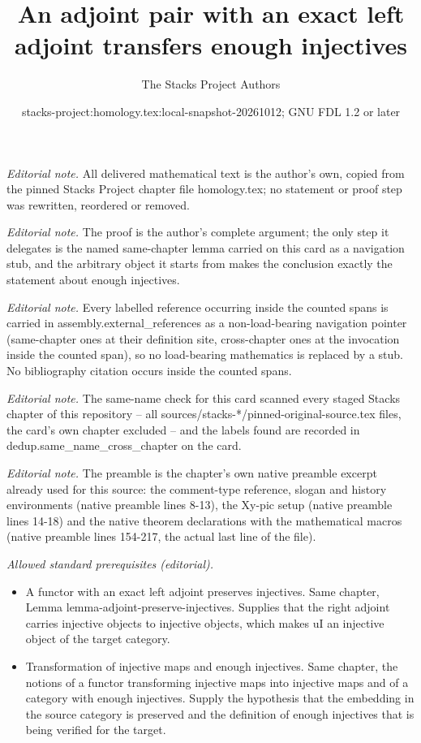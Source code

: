 \documentclass[10pt,a4paper]{amsart}
\title{An adjoint pair with an exact left adjoint transfers enough injectives}
\author{The Stacks Project Authors}
\date{stacks-project:homology.tex:local-snapshot-20261012; GNU FDL 1.2 or later}
\theoremstyle{plain}
\theoremstyle{definition}
\theoremstyle{remark}
\numberwithin{equation}{subsection}
\begin{document}
\maketitle
\noindent\textit{Editorial note.} All delivered mathematical text is the author's own, copied from the pinned Stacks Project chapter file homology.tex; no statement or proof step was rewritten, reordered or removed.\par\medskip
\noindent\textit{Editorial note.} The proof is the author's complete argument; the only step it delegates is the named same-chapter lemma carried on this card as a navigation stub, and the arbitrary object it starts from makes the conclusion exactly the statement about enough injectives.\par\medskip
\noindent\textit{Editorial note.} Every labelled reference occurring inside the counted spans is carried in assembly.external\_references as a non-load-bearing navigation pointer (same-chapter ones at their definition site, cross-chapter ones at the invocation inside the counted span), so no load-bearing mathematics is replaced by a stub. No bibliography citation occurs inside the counted spans.\par\medskip
\noindent\textit{Editorial note.} The same-name check for this card scanned every staged Stacks chapter of this repository -- all sources/stacks-*/pinned-original-source.tex files, the card's own chapter excluded -- and the labels found are recorded in dedup.same\_name\_cross\_chapter on the card.\par\medskip
\noindent\textit{Editorial note.} The preamble is the chapter's own native preamble excerpt already used for this source: the comment-type reference, slogan and history environments (native preamble lines 8-13), the Xy-pic setup (native preamble lines 14-18) and the native theorem declarations with the mathematical macros (native preamble lines 154-217, the actual last line of the file).\par\medskip
\noindent\textit{Allowed standard prerequisites (editorial).}\begin{itemize}
\item A functor with an exact left adjoint preserves injectives. Same chapter, Lemma lemma-adjoint-preserve-injectives. Supplies that the right adjoint carries injective objects to injective objects, which makes uI an injective object of the target category.
\item Transformation of injective maps and enough injectives. Same chapter, the notions of a functor transforming injective maps into injective maps and of a category with enough injectives. Supply the hypothesis that the embedding in the source category is preserved and the definition of enough injectives that is being verified for the target.
\end{itemize}\medskip
\end{document}

